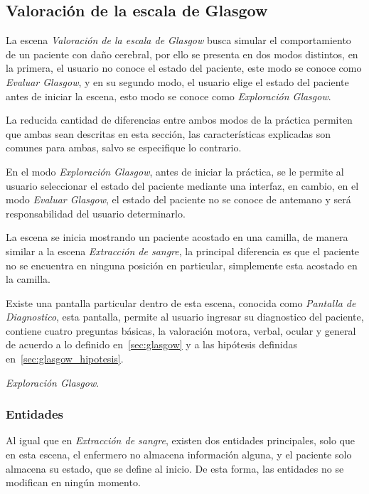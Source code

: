 \subsection{Valoración de la escala de Glasgow}


La escena  \emph{Valoración de la escala de Glasgow} busca simular el
comportamiento de un paciente con daño cerebral, por ello se presenta en dos
modos distintos, en la primera, el usuario no conoce el estado del paciente,
este modo se conoce como \emph{Evaluar Glasgow}, y en su segundo modo, el
usuario elige el estado del paciente antes de iniciar la escena, esto modo
se conoce como \emph{Exploración Glasgow}. 

La reducida cantidad de diferencias entre ambos modos de la práctica permiten
que ambas sean descritas en esta sección, las características explicadas son
comunes para ambas, salvo se especifique lo contrario.

En el modo \emph{Exploración Glasgow}, antes de iniciar la práctica, se le
permite al usuario seleccionar el estado del paciente mediante una interfaz, en
cambio, en el modo \emph{Evaluar Glasgow}, el estado del paciente no se conoce
de antemano y será responsabilidad del usuario determinarlo.

La escena se inicia mostrando un paciente acostado en una camilla, de manera
similar a la escena \emph{Extracción de sangre}, la principal diferencia es que
el paciente no se encuentra en ninguna posición en particular, simplemente esta
acostado en la camilla.

Existe una pantalla particular dentro de esta escena, conocida como
\emph{Pantalla de Diagnostico}, esta pantalla, permite al usuario ingresar su
diagnostico del paciente, contiene cuatro preguntas básicas, la valoración
motora, verbal, ocular y general de acuerdo a lo definido en~\ref{sec:glasgow} y
a las hipótesis definidas en~\ref{sec:glasgow_hipotesis}.

\emph{Exploración Glasgow}.

\subsubsection{Entidades}

Al igual que en \emph{Extracción de sangre}, existen dos entidades principales,
solo que en esta escena, el enfermero no almacena información alguna, y el
paciente solo almacena su estado, que se define al inicio. De esta forma, las
entidades no se modifican en ningún momento.

